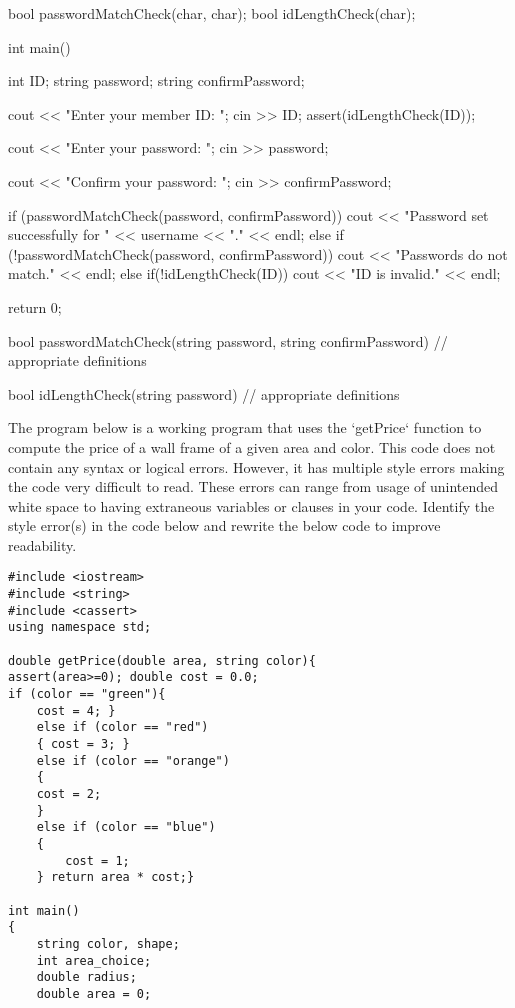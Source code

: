 {{{{{{{bool passwordMatchCheck(char, char);
bool idLengthCheck(char);

int main() {
    int ID;
    string password;
    string confirmPassword;

    cout << "Enter your member ID: ";
    cin >> ID;
    assert(idLengthCheck(ID));
    
    cout << "Enter your password: ";
    cin >> password;

    cout << "Confirm your password: ";
    cin >> confirmPassword;

    if (passwordMatchCheck(password, confirmPassword)) 
    {
        cout << "Password set successfully for " << username << "." << endl;
    } 
    else if (!passwordMatchCheck(password, confirmPassword)) 
    {
        cout << "Passwords do not match." << endl;
    } 
    else if(!idLengthCheck(ID)) 
    {
        cout << "ID is invalid." << endl;
    }

    return 0;
}

bool passwordMatchCheck(string password, string confirmPassword)
{
    // appropriate definitions
}

bool idLengthCheck(string password)
{
    // appropriate definitions
}
{%



\begin{multipart}
The program below is a working program that uses the `getPrice` function to compute the price of a wall frame of a given area and color. This code does not contain any syntax or logical errors. However, it has multiple style errors making the code very difficult to read. These errors can range from usage of unintended white space to having extraneous variables or clauses in your code. Identify the style error(s) in the code below and rewrite the below code to improve readability.


\end{multipart}

\begin{verbatim}
#include <iostream>
#include <string>
#include <cassert>
using namespace std;

double getPrice(double area, string color){
assert(area>=0); double cost = 0.0;
if (color == "green"){
    cost = 4; }
    else if (color == "red")
    { cost = 3; } 
    else if (color == "orange")
    {
    cost = 2;
    }
    else if (color == "blue")
    {
        cost = 1;
    } return area * cost;}

int main()
{
    string color, shape;
    int area_choice;
    double radius;
    double area = 0;


\end{verbatim}}}}}}}}}

